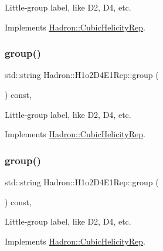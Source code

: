 Little-\/group label, like D2, D4, etc. 

Implements \mbox{\hyperlink{structHadron_1_1CubicHelicityRep_a101a7d76cd8ccdad0f272db44b766113}{Hadron\+::\+Cubic\+Helicity\+Rep}}.

\mbox{\label{structHadron_1_1H1o2D4E1Rep_a450bf31aa04b582fae7cf5cdb6c987f7}} 
\subsubsection{\texorpdfstring{group()}{group()}\hspace{0.1cm}{\footnotesize\ttfamily [3/5]}}
{\footnotesize\ttfamily std\+::string Hadron\+::\+H1o2\+D4\+E1\+Rep\+::group (\begin{DoxyParamCaption}{ }\end{DoxyParamCaption}) const\hspace{0.3cm}{\ttfamily [inline]}, {\ttfamily [virtual]}}

Little-\/group label, like D2, D4, etc. 

Implements \mbox{\hyperlink{structHadron_1_1CubicHelicityRep_a101a7d76cd8ccdad0f272db44b766113}{Hadron\+::\+Cubic\+Helicity\+Rep}}.

\mbox{\label{structHadron_1_1H1o2D4E1Rep_a450bf31aa04b582fae7cf5cdb6c987f7}} 
\subsubsection{\texorpdfstring{group()}{group()}\hspace{0.1cm}{\footnotesize\ttfamily [4/5]}}
{\footnotesize\ttfamily std\+::string Hadron\+::\+H1o2\+D4\+E1\+Rep\+::group (\begin{DoxyParamCaption}{ }\end{DoxyParamCaption}) const\hspace{0.3cm}{\ttfamily [inline]}, {\ttfamily [virtual]}}

Little-\/group label, like D2, D4, etc. 

Implements \mbox{\hyperlink{structHadron_1_1CubicHelicityRep_a101a7d76cd8ccdad0f272db44b766113}{Hadron\+::\+Cubic\+Helicity\+Rep}}.

